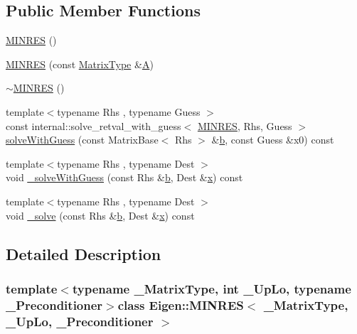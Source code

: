 \subsection*{Public Member Functions}
\begin{DoxyCompactItemize}
\item 
\hyperlink{class_eigen_1_1_m_i_n_r_e_s_aa519021be1178a99f5f9ec633de9fc09}{M\+I\+N\+R\+E\+S} ()
\item 
\hyperlink{class_eigen_1_1_m_i_n_r_e_s_a4ef44ec534e5b25fcef2f34987d31b6d}{M\+I\+N\+R\+E\+S} (const \hyperlink{class_eigen_1_1_m_i_n_r_e_s_a8ce71aa3d9a30f0b6e87e5e96555c4c1}{Matrix\+Type} \&\hyperlink{plot_stress_strain_8m_a3b98e2dffc6cb06a89dcb0d5c60a0206}{A})
\item 
\hyperlink{class_eigen_1_1_m_i_n_r_e_s_a3f40ba58caac8b10ae7df474af93a05b}{$\sim$\+M\+I\+N\+R\+E\+S} ()
\item 
{\footnotesize template$<$typename Rhs , typename Guess $>$ }\\const internal\+::solve\+\_\+retval\+\_\+with\+\_\+guess$<$ \hyperlink{class_eigen_1_1_m_i_n_r_e_s}{M\+I\+N\+R\+E\+S}, Rhs, Guess $>$ \hyperlink{class_eigen_1_1_m_i_n_r_e_s_a79907c3bd74bed0100b3c58ba97b8091}{solve\+With\+Guess} (const Matrix\+Base$<$ Rhs $>$ \&\hyperlink{generate_loop_8m_a8628bb51afad38fac21e20697927b6cb}{b}, const Guess \&x0) const 
\item 
{\footnotesize template$<$typename Rhs , typename Dest $>$ }\\void \hyperlink{class_eigen_1_1_m_i_n_r_e_s_aa41f4d35e5f3bd95dd59cccabbbf8c54}{\+\_\+solve\+With\+Guess} (const Rhs \&\hyperlink{generate_loop_8m_a8628bb51afad38fac21e20697927b6cb}{b}, Dest \&\hyperlink{generate_s_t_lcyl_8m_a9336ebf25087d91c818ee6e9ec29f8c1}{x}) const 
\item 
{\footnotesize template$<$typename Rhs , typename Dest $>$ }\\void \hyperlink{class_eigen_1_1_m_i_n_r_e_s_afb0937784f1dc9f0c01a260a6e7e0252}{\+\_\+solve} (const Rhs \&\hyperlink{generate_loop_8m_a8628bb51afad38fac21e20697927b6cb}{b}, Dest \&\hyperlink{generate_s_t_lcyl_8m_a9336ebf25087d91c818ee6e9ec29f8c1}{x}) const 
\end{DoxyCompactItemize}


\subsection{Detailed Description}
\subsubsection*{template$<$typename \+\_\+\+Matrix\+Type, int \+\_\+\+Up\+Lo, typename \+\_\+\+Preconditioner$>$class Eigen\+::\+M\+I\+N\+R\+E\+S$<$ \+\_\+\+Matrix\+Type, \+\_\+\+Up\+Lo, \+\_\+\+Preconditioner $>$}

